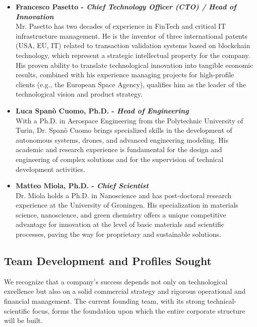 \documentclass[11pt, a4paper, oneside]{article}
\begin{document}
\begin{itemize}
    \item \textbf{Francesco Pasetto - \textit{Chief Technology Officer (CTO) / Head of Innovation}} \\
    Mr. Pasetto has two decades of experience in FinTech and critical IT infrastructure management. He is the inventor of three international patents (USA, EU, IT) related to transaction validation systems based on blockchain technology, which represent a strategic intellectual property for the company. His proven ability to translate technological innovation into tangible economic results, combined with his experience managing projects for high-profile clients (e.g., the European Space Agency), qualifies him as the leader of the technological vision and product strategy.

    \item \textbf{Luca Spanò Cuomo, Ph.D. - \textit{Head of Engineering}} \\
    With a Ph.D. in Aerospace Engineering from the Polytechnic University of Turin, Dr. Spanò Cuomo brings specialized skills in the development of autonomous systems, drones, and advanced engineering modeling. His academic and research experience is fundamental for the design and engineering of complex solutions and for the supervision of technical development activities.

    \item \textbf{Matteo Miola, Ph.D. - \textit{Chief Scientist}} \\
    Dr. Miola holds a Ph.D. in Nanoscience and has post-doctoral research experience at the University of Groningen. His specialization in materials science, nanoscience, and green chemistry offers a unique competitive advantage for innovation at the level of basic materials and scientific processes, paving the way for proprietary and sustainable solutions.
\end{itemize}

\subsection{Team Development and Profiles Sought}

We recognize that a company's success depends not only on technological excellence but also on a solid commercial strategy and rigorous operational and financial management. The current founding team, with its strong technical-scientific focus, forms the foundation upon which the entire corporate structure will be built.
\end{document}
